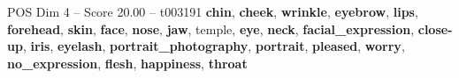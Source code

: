 \begin{textsample}{POS Dim 4 – Score 20.00 – t003191}  \label{ex:f4_pos_020}
\textbf{chin}, \textbf{cheek}, \textbf{wrinkle}, \textbf{eyebrow}, \textbf{lips}, \textbf{forehead}, \textbf{skin}, \textbf{face}, \textbf{nose}, \textbf{jaw}, temple, \textbf{eye}, \textbf{neck}, \textbf{facial\_expression}, \textbf{close-up}, \textbf{iris}, \textbf{eyelash}, \textbf{portrait\_photography}, \textbf{portrait}, \textbf{pleased}, \textbf{worry}, \textbf{no\_expression}, \textbf{flesh}, \textbf{happiness}, \textbf{throat}

\end{textsample}
